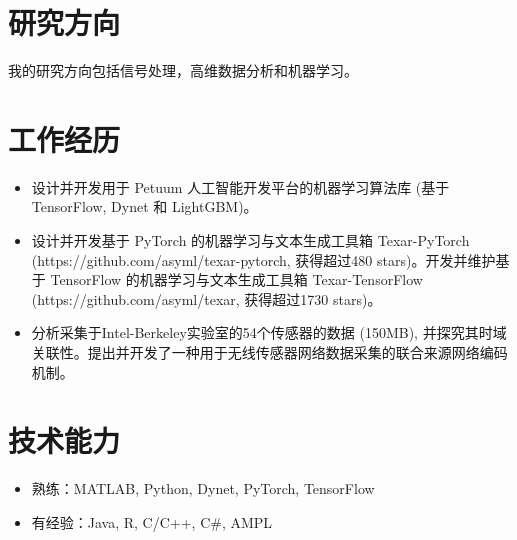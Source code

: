 \documentclass{resume}
\begin{document}


\section{研究方向}
我的研究方向包括信号处理，高维数据分析和机器学习。


\section{工作经历}
\begin{itemize}
\item 设计并开发用于 Petuum 人工智能开发平台的机器学习算法库 (基于 TensorFlow, Dynet 和 LightGBM)。
\item  设计并开发基于 PyTorch 的机器学习与文本生成工具箱 Texar-PyTorch (https://github.com/asyml/texar-pytorch, 获得超过480 stars)。开发并维护基于 TensorFlow 的机器学习与文本生成工具箱 Texar-TensorFlow (https://github.com/asyml/texar, 获得超过1730 stars)。
\end{itemize}

\begin{itemize}
\item 分析采集于Intel-Berkeley实验室的54个传感器的数据 (150MB), 并探究其时域关联性。提出并开发了一种用于无线传感器网络数据采集的联合来源网络编码机制。
\end{itemize}


\section{技术能力}
\begin{itemize}[parsep=0.2ex]
\item 熟练：MATLAB, Python, Dynet, PyTorch, TensorFlow
\item 有经验：Java, R, C/C++, C\#, AMPL
\end{itemize}
\end{document}
